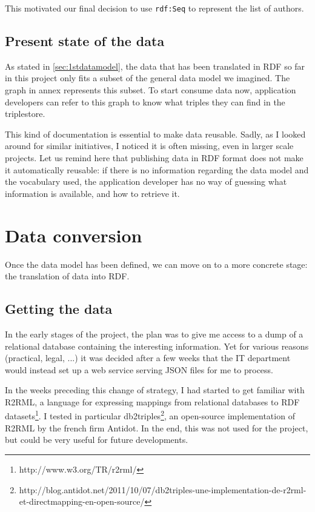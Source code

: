 \documentclass[a4paper,11pt]{report}
\begin{document}
This motivated our final decision to use \texttt{rdf:Seq} to represent the list of authors. 
\section{Present state of the data}
As stated in \ref{sec:1stdatamodel}, the data that has been translated in RDF so far in this project only fits a subset of the general data model we imagined. The graph 
in annex represents this subset. To start consume data now, application developers can refer to this graph to know what triples they can find in the triplestore. 

This kind of documentation is essential to make data reusable. Sadly, as I looked around for similar initiatives, I noticed it is often missing, even in larger scale projects. Let us remind here that publishing data in RDF format does not make it automatically reusable: if there is no information regarding the data model and the vocabulary used, the application developer has no way of guessing what information is available, and how to retrieve it. 



\chapter{Data conversion}
Once the data model has been defined, we can move on to a more concrete stage: the translation of data into RDF. 
\section{Getting the data} 
In the early stages of the project, the plan was to give me access to a dump of a relational database containing the interesting information. Yet for various reasons (practical, legal, ...) it was decided after a few weeks that the IT department would instead set up a web service serving JSON files for me to process. 

In the weeks preceding this change of strategy, I had started to get familiar with R2RML, a language for expressing mappings from relational databases to RDF datasets\footnote{http://www.w3.org/TR/r2rml/}. I tested in particular db2triples\footnote{http://blog.antidot.net/2011/10/07/db2triples-une-implementation-de-r2rml-et-directmapping-en-open-source/}, an open-source implementation of R2RML by the french firm Antidot. In the end, this was not used for the project, but could be very useful for future developments. 
\end{document}
